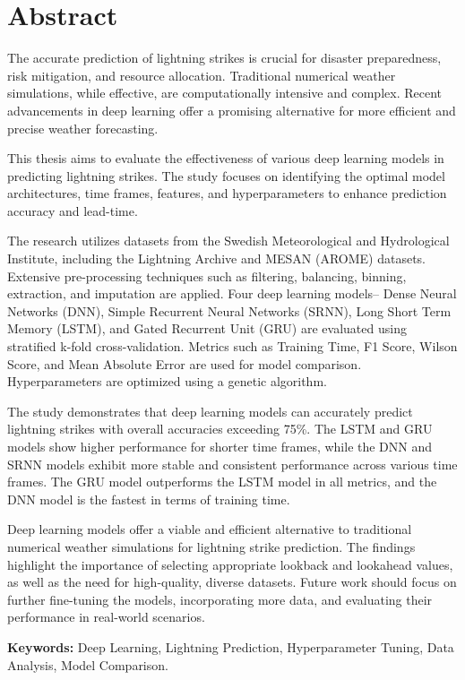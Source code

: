 \chapter*{Abstract}
\label{sec:abstract}


The accurate prediction of lightning strikes is crucial for disaster preparedness, risk mitigation, and resource allocation. Traditional numerical weather simulations, while effective, are computationally intensive and complex. Recent advancements in deep learning offer a promising alternative for more efficient and precise weather forecasting.

This thesis aims to evaluate the effectiveness of various deep learning models in predicting lightning strikes. The study focuses on identifying the optimal model architectures, time frames, features, and hyperparameters to enhance prediction accuracy and lead-time.

The research utilizes datasets from the Swedish Meteorological and Hydrological Institute, including the Lightning Archive and MESAN (AROME) datasets. Extensive pre-processing techniques such as filtering, balancing, binning, extraction, and imputation are applied. Four deep learning models-- Dense Neural Networks (DNN), Simple Recurrent Neural Networks (SRNN), Long Short Term Memory (LSTM), and Gated Recurrent Unit (GRU) are evaluated using stratified k-fold cross-validation. Metrics such as Training Time, F1 Score, Wilson Score, and Mean Absolute Error are used for model comparison. Hyperparameters are optimized using a genetic algorithm.

The study demonstrates that deep learning models can accurately predict lightning strikes with overall accuracies exceeding 75\%. The LSTM and GRU models show higher performance for shorter time frames, while the DNN and SRNN models exhibit more stable and consistent performance across various time frames. The GRU model outperforms the LSTM model in all metrics, and the DNN model is the fastest in terms of training time.

Deep learning models offer a viable and efficient alternative to traditional numerical weather simulations for lightning strike prediction. The findings highlight the importance of selecting appropriate lookback and lookahead values, as well as the need for high-quality, diverse datasets. Future work should focus on further fine-tuning the models, incorporating more data, and evaluating their performance in real-world scenarios.

\textbf{Keywords:} Deep Learning, Lightning Prediction, Hyperparameter Tuning, Data Analysis, Model Comparison.

